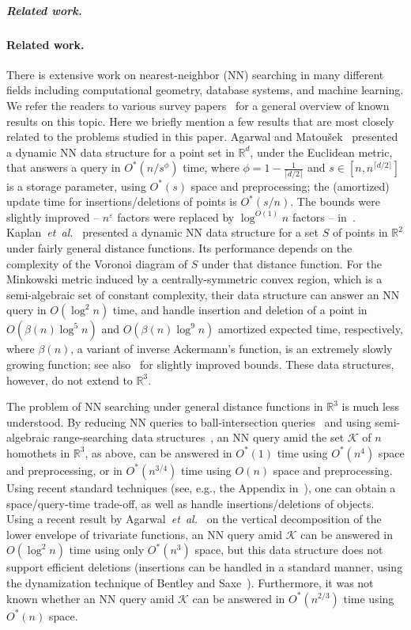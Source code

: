 \documentclass[11pt]{article}
\def\reals{{\mathbb R}}
\def\eps{{\varepsilon}}
\def\K{\mathcal{K}}
\def\ceil#1{\lceil #1\rceil}
\def\etal{\textsl{et~al.}}
\theoremstyle{definition}
\begin{document}
\ifsocgproc 
\subparagraph*{Related work.}
\else
\paragraph{Related work.}
\fi
There is extensive work on nearest-neighbor (NN) searching in many different fields including
computational geometry, database systems, and machine learning. We refer the readers to 
various survey papers~\cite{AE99,AI17,Cl} for a general overview of known results on this topic. 
Here we briefly mention a few results that are most closely related to the problems studied 
in this paper. Agarwal and Matou\v{s}ek~\cite{AM95} presented a dynamic NN data structure for 
a point set in $\reals^d$, under the Euclidean metric, that answers a query in $O^*(n/s^\phi)$ 
time, where $\phi=1-\tfrac{1}{\ceil{d/2}}$ and $s \in [n,n^{\ceil{d/2}}]$ is a storage parameter, 
using $O^*(s)$ space and preprocessing; the (amortized) update time for insertions/deletions of 
points is $O^*(s/n)$. The bounds were slightly improved -- $n^\eps$ factors were replaced by 
$\log^{O(1)}n$ factors -- in~\cite{Chan:le,KMRSS}.
Kaplan~\etal~\cite{KMRSS} presented a dynamic NN data structure for a set $S$ of points in 
$\reals^2$ under fairly general distance functions. Its performance depends on the 
complexity of the Voronoi diagram of $S$ under that distance function. For the Minkowski 
metric induced by a centrally-symmetric convex region, which is a semi-algebraic set of
constant complexity, their data structure can answer an NN query in $O(\log^2n)$ time, and handle 
insertion and deletion of a point in $O(\beta(n)\log^5n )$ and $O(\beta(n)\log^9n)$ 
amortized expected time, respectively, where $\beta(n)$, a variant of inverse Ackermann's function, is
an extremely slowly growing function; see also~\cite{Liu} for slightly improved bounds. 
These data structures, however, do not extend to $\reals^3$.

The problem of NN searching under general distance functions
in $\reals^3$ is much less understood.
By reducing NN queries to ball-intersection queries~\cite{AM93} and 
using semi-algebraic range-searching data structures~\cite{AAEZ,MP,AAEKS}, an NN query 
amid the set $\K$ of $n$ homothets in $\reals^3$, as above, can be answered in $O^*(1)$ time 
using $O^*(n^4)$ space and preprocessing, or in $O^*(n^{3/4})$ time using $O(n)$ space and preprocessing. 
Using recent standard techniques (see, e.g., the Appendix in~\cite{AAEKS}),
one can obtain a space/query-time trade-off, as well as handle insertions/deletions of objects.
Using a recent result by Agarwal~\etal~\cite{AES:vd} on the vertical decomposition of the lower 
envelope of trivariate functions, an NN query amid $\K$ can be answered in $O(\log^2 n)$ time 
using only $O^*(n^3)$ space, but this data structure does not support efficient deletions 
(insertions can be handled in a standard manner, using the dynamization technique 
of Bentley and Saxe~\cite{BS80}). Furthermore, it was not known whether an NN query 
amid $\K$ can be answered in $O^*(n^{2/3})$ time using $O^*(n)$ space.
\end{document}
